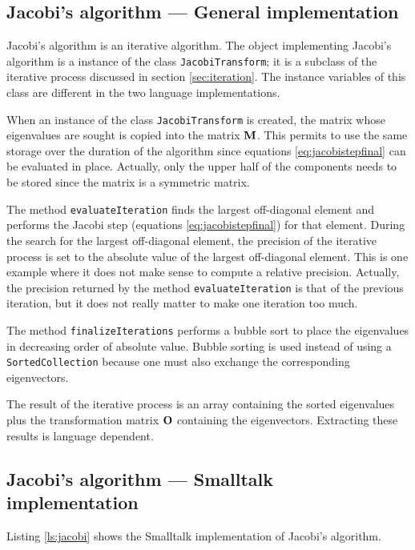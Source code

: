 \documentclass[twoside]{book}
\begin{document}
\subsection{Jacobi's algorithm --- General implementation}
Jacobi's algorithm is an iterative
algorithm. The object implementing Jacobi's algorithm is a
instance of the class {\tt JacobiTransform}; it is a subclass of
the iterative process discussed in section \ref{sec:iteration}.
The instance variables of this class are different in the two
language implementations.

When an instance of the class {\tt JacobiTransform} is created,
the matrix whose eigenvalues are sought is copied into the matrix
${\bf M}$. This permits to use the same storage over the duration
of the algorithm since equations \ref{eq:jacobistepfinal} can be
evaluated in place. Actually, only the upper half of the
components needs to be stored since the matrix is a symmetric
matrix.

The method {\tt evaluateIteration} finds the largest off-diagonal
element and performs the Jacobi step (equations
\ref{eq:jacobistepfinal}) for that element. During the search for
the largest off-diagonal element, the precision of the iterative
process is set to the absolute value of the largest off-diagonal
element. This is one example where it does not make sense to
compute a relative precision. Actually, the precision returned by
the method {\tt evaluateIteration} is that of the previous
iteration, but it does not really matter to make one iteration too
much.

The method {\tt finalizeIterations} performs a bubble sort to
place the eigenvalues in decreasing order of absolute value.
Bubble sorting is used instead of using a {\tt SortedCollection}
because one must also exchange the corresponding eigenvectors.

The result of the iterative process is an array containing the
sorted eigenvalues plus the transformation matrix ${\bf O}$
containing the eigenvectors. Extracting these results is language
dependent.

\subsection{Jacobi's algorithm --- Smalltalk implementation}
Listing \ref{ls:jacobi} shows the Smalltalk implementation of
Jacobi's algorithm.
\end{document}
